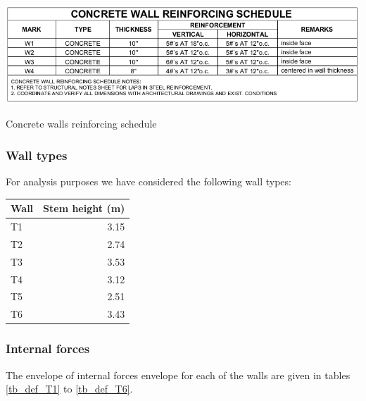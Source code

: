 \begin{table}
    \includegraphics[width=\linewidth]{figures/concrete_wall_reinforcing_schedule.png}
    \caption{Concrete walls reinforcing schedule}\label{tb_concrete_wall_reinforcing_schedule}
\end{table}

\subsubsection{Wall types}
For analysis purposes we have considered the following wall types:

\begin{center}
  \begin{tabular}{|l|r|}
    \hline
    \textbf{Wall} & \textbf{Stem height (m)} \\
    \hline
T1 & 3.15\\
T2 & 2.74\\
T3 & 3.53\\
T4 & 3.12\\
T5 & 2.51\\
T6 & 3.43\\
    \hline
  \end{tabular}
\end{center}

\subsubsection{Internal forces}
The envelope of internal forces envelope for each of the walls are given in tables \ref{tb_def_T1} to \ref{tb_def_T6}.

